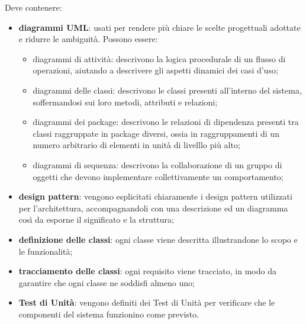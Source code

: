   Deve contenere:
  \begin{itemize}
		\item{\textbf{diagrammi UML}}: usati per rendere più chiare le scelte progettuali adottate e ridurre le ambiguità. Possono essere:
				\begin{itemize}
							\item{diagrammi di attività}: descrivono la logica procedurale di un flusso di operazioni, aiutando a descrivere gli aspetti dinamici dei casi d'uso;
				\item{diagrammi delle classi:} descrivono le classi presenti all'interno del sistema, soffermandosi sui loro metodi, attributi e relazioni;
				\item{diagrammi dei package}: descrivono le relazioni di dipendenza presenti tra classi raggruppate in package diversi, ossia in raggruppamenti di un numero arbitrario di elementi in unità di livelllo più alto;
			\item{diagrammi di sequenza}: descrivono la collaborazione di un gruppo di oggetti che devono implementare collettivamente un comportamento;
		\end{itemize}
		\item \textbf{design pattern}: vengono esplicitati chiaramente i design pattern utilizzati per l'architettura, accompagnandoli con una descrizione ed un diagramma così da esporne il significato e la struttura;
		\item \textbf{definizione delle classi}: ogni classe viene descritta illustrandone lo scopo e le funzionalità;
		\item \textbf{tracciamento delle classi}: ogni requisito viene tracciato, in modo da garantire che ogni classe ne soddisfi almeno uno;
		\item \textbf{Test di Unità}: vengono definiti dei Test di Unità per verificare che le componenti del sistema funzionino come previsto.
  \end{itemize}

